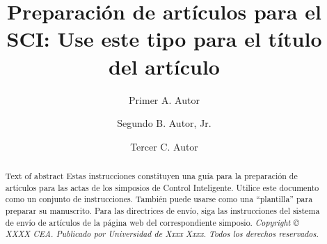 \documentclass[5p,times,authoryear]{elsarticle}
\begin{document}
\begin{frontmatter}






\title{Preparación de artículos para el SCI: Use este tipo para el título del artículo}



\author[First]{Primer A. Autor}

\author[Second]{Segundo B. Autor, Jr.}

\author[Third]{Tercer C. Autor}



\address[First]{Comité Español de Automática, Parc Tecnologic de Barcelona, Edifici U, C/ Llorens i Artigas, 4-6, 08028 Barcelona, España. }
\address[Second]{Departamento de Automática, Ingeniería Electrónica e Informática, Universidad Politécnica de Madrid,  C/ José Gutiérrez Abascal, na2, 28006, Madrid,  España.}
\address[Third]{Departamento de Ingeniería de Sistemas y Automática,  Universitat Politècnica de Valencia, Camino de Vera, na14, 46022, Valencia, España.}

\begin{abstract}
 Text of abstract
Estas instrucciones constituyen una guía para la preparación de artículos para las actas de los simposios de Control Inteligente. Utilice este documento como un conjunto de instrucciones. También puede usarse como una ``plantilla'' para preparar su manuscrito. Para las directrices de envío, siga las instrucciones del sistema de envío de artículos de la página web del correspondiente simposio. \emph{Copyright {\copyright} XXXX CEA. Publicado por Universidad de Xxxx Xxxx. Todos los derechos reservados.}
\end{abstract}


\end{frontmatter}
\end{document}

